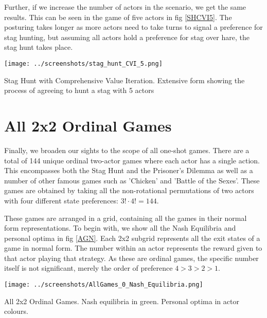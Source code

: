 Further, if we increase the number of actors in the scenario, we get the same results. This can be seen in the game of five actors in fig \ref{SHCVI5}. The posturing takes longer as more actors need to take turns to signal a preference for stag hunting, but assuming all actors hold a preference for stag over hare, the stag hunt takes place.

\begin{fig}[H]
  \begin{minipage}[b]{1.0\linewidth}
    \centering
    \centerline{\texttt{[image: ../screenshots/stag\_hunt\_CVI\_5.png]}}
    \caption{Stag Hunt with Comprehensive Value Iteration. Extensive form showing the process of agreeing to hunt a stag with 5 actors}\medskip\label{SHCVI5}
  \end{minipage}
\end{fig}
\section{All 2x2 Ordinal Games}

Finally, we broaden our sights to the scope of all one-shot games. There are a total of 144 unique ordinal two-actor games where each actor has a single action. This encompasses both the Stag Hunt and the Prisoner's Dilemma as well as a number of other famous games such as 'Chicken' and 'Battle of the Sexes'. These games are obtained by taking all the non-rotational permutations of two actors with four different state preferences: $3! \cdot 4!=144$.

These games are arranged in a grid, containing all the games in their normal form representations. To begin with, we show all the Nash Equilibria and personal optima in fig \ref{AGN}. Each 2x2 subgrid represents all the exit states of a game in normal form. The number within an actor represents the reward given to that actor playing that strategy. As these are ordinal games, the specific number itself is not significant, merely the order of preference $4>3>2>1$.

\begin{fig}[H]
  \begin{minipage}[b]{1.0\linewidth}
    \centering
    \centerline{\texttt{[image: ../screenshots/AllGames\_0\_Nash\_Equilibria.png]}}
    \caption{All 2x2 Ordinal Games. Nash equilibria in green. Personal optima in actor colours.}\medskip\label{AGN}
  \end{minipage}
\end{fig}

